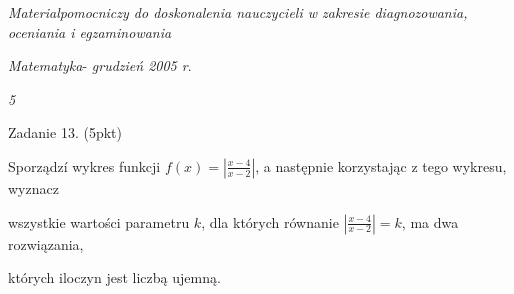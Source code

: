\documentclass[a4paper,12pt]{article}
\begin{document}
{\it Materialpomocniczy do doskonalenia nauczycieli w zakresie diagnozowania, oceniania i egzaminowania}

{\it Matematyka}- {\it grudzień 2005 r}.

{\it 5}

Zadanie 13. (5pkt)

Sporządzí wykres funkcji $f(x)=|\displaystyle \frac{x-4}{x-2}|$, a następnie korzystając z tego wykresu, wyznacz

wszystkie wartości parametru $k$, dla których równanie $|\displaystyle \frac{x-4}{x-2}|=k$, ma dwa rozwiązania,

których iloczyn jest liczbą ujemną.
\end{document}
